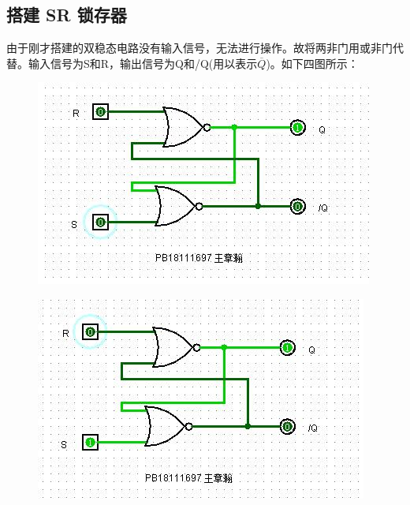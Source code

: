 \documentclass[UTF8]{article}
\begin{document}
	\subsection{搭建 SR 锁存器}
	由于刚才搭建的双稳态电路没有输入信号，无法进行操作。故将两非门用或非门代替。输入信号为S和R，输出信号为Q和/Q(用以表示$\overline{Q}$)。如下四图所示：
	
	\begin{figure}[H]
		\begin{minipage}[H]{0.49\linewidth}
			\centering
			\includegraphics[width=1\linewidth]{2_00.jpg}
			\label{2_00}
		\end{minipage}
		\begin{minipage}[H]{0.49\linewidth}
			\centering
			\includegraphics[width=1\linewidth]{2_01.jpg}
			\label{2_01}
		\end{minipage}\\
		\begin{minipage}[H]{0.49\linewidth}
			\centering

\end{minipage}
\end{figure}
\end{document}
